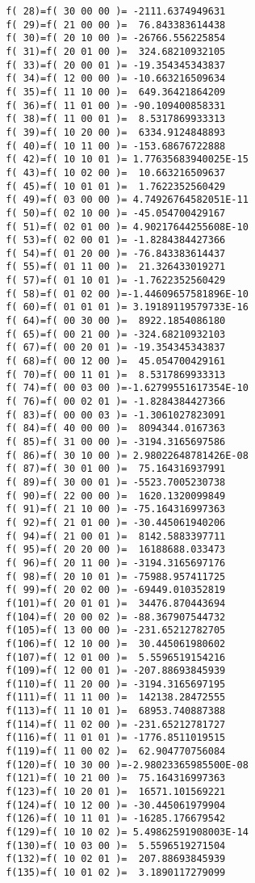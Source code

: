 \begin{footnotesize}
\begin{verbatim}
 f( 28)=f( 30 00 00 )= -2111.6374949631
 f( 29)=f( 21 00 00 )=  76.843383614438
 f( 30)=f( 20 10 00 )= -26766.556225854
 f( 31)=f( 20 01 00 )=  324.68210932105
 f( 33)=f( 20 00 01 )= -19.354345343837
 f( 34)=f( 12 00 00 )= -10.663216509634
 f( 35)=f( 11 10 00 )=  649.36421864209
 f( 36)=f( 11 01 00 )= -90.109400858331
 f( 38)=f( 11 00 01 )=  8.5317869933313
 f( 39)=f( 10 20 00 )=  6334.9124848893
 f( 40)=f( 10 11 00 )= -153.68676722888
 f( 42)=f( 10 10 01 )= 1.77635683940025E-15
 f( 43)=f( 10 02 00 )=  10.663216509637
 f( 45)=f( 10 01 01 )=  1.7622352560429
 f( 49)=f( 03 00 00 )= 4.74926764582051E-11
 f( 50)=f( 02 10 00 )= -45.054700429167
 f( 51)=f( 02 01 00 )= 4.90217644255608E-10
 f( 53)=f( 02 00 01 )= -1.8284384427366
 f( 54)=f( 01 20 00 )= -76.843383614437
 f( 55)=f( 01 11 00 )=  21.326433019271
 f( 57)=f( 01 10 01 )= -1.7622352560429
 f( 58)=f( 01 02 00 )=-1.44609657581896E-10
 f( 60)=f( 01 01 01 )= 3.19189119579733E-16
 f( 64)=f( 00 30 00 )=  8922.1854086180
 f( 65)=f( 00 21 00 )= -324.68210932103
 f( 67)=f( 00 20 01 )= -19.354345343837
 f( 68)=f( 00 12 00 )=  45.054700429161
 f( 70)=f( 00 11 01 )=  8.5317869933313
 f( 74)=f( 00 03 00 )=-1.62799551617354E-10
 f( 76)=f( 00 02 01 )= -1.8284384427366
 f( 83)=f( 00 00 03 )= -1.3061027823091
 f( 84)=f( 40 00 00 )=  8094344.0167363
 f( 85)=f( 31 00 00 )= -3194.3165697586
 f( 86)=f( 30 10 00 )= 2.98022648781426E-08
 f( 87)=f( 30 01 00 )=  75.164316937991
 f( 89)=f( 30 00 01 )= -5523.7005230738
 f( 90)=f( 22 00 00 )=  1620.1320099849
 f( 91)=f( 21 10 00 )= -75.164316997363
 f( 92)=f( 21 01 00 )= -30.445061940206
 f( 94)=f( 21 00 01 )=  8142.5883397711
 f( 95)=f( 20 20 00 )=  16188688.033473
 f( 96)=f( 20 11 00 )= -3194.3165697176
 f( 98)=f( 20 10 01 )= -75988.957411725
 f( 99)=f( 20 02 00 )= -69449.010352819
 f(101)=f( 20 01 01 )=  34476.870443694
 f(104)=f( 20 00 02 )= -88.367907544732
 f(105)=f( 13 00 00 )= -231.65212782705
 f(106)=f( 12 10 00 )=  30.445061980602
 f(107)=f( 12 01 00 )=  5.5596519154216
 f(109)=f( 12 00 01 )= -207.88693845939
 f(110)=f( 11 20 00 )= -3194.3165697195
 f(111)=f( 11 11 00 )=  142138.28472555
 f(113)=f( 11 10 01 )=  68953.740887388
 f(114)=f( 11 02 00 )= -231.65212781727
 f(116)=f( 11 01 01 )= -1776.8511019515
 f(119)=f( 11 00 02 )=  62.904770756084
 f(120)=f( 10 30 00 )=-2.98023365985500E-08
 f(121)=f( 10 21 00 )=  75.164316997363
 f(123)=f( 10 20 01 )=  16571.101569221
 f(124)=f( 10 12 00 )= -30.445061979904
 f(126)=f( 10 11 01 )= -16285.176679542
 f(129)=f( 10 10 02 )= 5.49862591908003E-14
 f(130)=f( 10 03 00 )=  5.5596519271504
 f(132)=f( 10 02 01 )=  207.88693845939
 f(135)=f( 10 01 02 )=  3.1890117279099

\end{verbatim}
\end{footnotesize}
